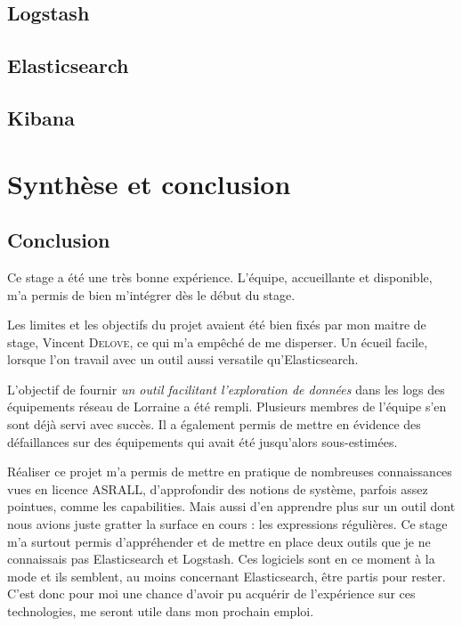 \documentclass[a4paper,12pt,one side,titlepage]{report}
\begin{document}
\chapter{Logstash}


\chapter{Elasticsearch}


\chapter{Kibana}


\part{Synthèse et conclusion}


\chapter{Conclusion}
Ce stage a été une très bonne expérience. L'équipe, accueillante et disponible, m'a
permis de bien m'intégrer dès le début du stage. 

Les limites et les objectifs du projet avaient été bien fixés par mon maitre de stage, 
Vincent \textsc{Delove}, ce qui m'a empêché de me disperser. Un écueil facile, lorsque 
l'on travail avec un outil aussi versatile qu'Elasticsearch.

L'objectif de fournir \emph{un outil facilitant l'exploration de données} dans les 
\gls{logs} des équipements réseau de Lorraine a été rempli. 
Plusieurs membres de l'équipe s'en sont déjà servi avec succès. Il a également permis 
de mettre en évidence des défaillances sur des équipements qui avait été jusqu'alors 
sous-estimées.


Réaliser ce projet m'a permis de mettre en pratique de nombreuses connaissances vues 
en licence ASRALL, d'approfondir des notions de système, parfois assez pointues, 
comme les capabilities. Mais aussi d'en apprendre plus sur un outil dont nous avions
juste gratter la surface en cours : les expressions régulières. Ce stage m'a surtout 
permis d'appréhender et de mettre en place deux outils que je ne connaissais pas 
Elasticsearch et Logstash. Ces logiciels sont en ce moment à la mode et ils semblent,
au moins concernant Elasticsearch, être partis pour rester. C'est donc pour moi une chance
d'avoir pu acquérir de l'expérience sur ces technologies, me seront utile dans mon 
prochain emploi.
\end{document}
